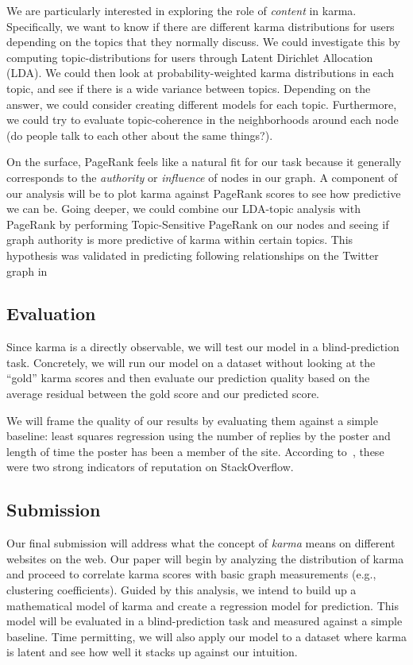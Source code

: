 \documentclass[10pt]{article}
\begin{document}
We are particularly interested in exploring the role of \textit{content} in
karma. Specifically, we want to know if there are different karma distributions
for users depending on the topics that they normally discuss. We could
investigate this by computing topic-distributions for users through Latent
Dirichlet Allocation (LDA). We could then look at probability-weighted karma
distributions in each topic, and see if there is a wide variance between topics.
Depending on the answer, we could consider creating different models for each
topic. Furthermore, we could try to evaluate topic-coherence in the
neighborhoods around each node (do people talk to each other about the same
things?).

On the surface, PageRank feels like a natural fit for our task because it
generally corresponds to the \textit{authority} or \textit{influence} of nodes
in our graph. A component of our analysis will be to plot karma against PageRank
scores to see how predictive we can be.  Going deeper, we could combine our
LDA-topic analysis with PageRank by performing Topic-Sensitive PageRank
\citep{haveliwala2002topic} on our nodes and seeing if graph authority is more
predictive of karma within certain topics. This hypothesis was validated in
predicting following relationships on the Twitter graph in
\citet{weng2010twitterrank}

\subsection{Evaluation}
Since karma is a directly observable, we will test our model in a
blind-prediction task. Concretely, we will run our model on a dataset without
looking at the ``gold'' karma scores and then evaluate our prediction quality
based on the average residual between the gold score and our predicted score.

We will frame the quality of our results by evaluating them against a simple
baseline: least squares regression using the number of replies by the poster and
length of time the poster has been a member of the site. According
to~\citet{movshovitzanalysis}, these were two strong indicators of reputation on
StackOverflow. 

\subsection{Submission}

Our final submission will address what the concept of \textit{karma} means on
different websites on the web. Our paper will begin by analyzing the
distribution of karma and proceed to correlate karma scores with basic graph
measurements (e.g., clustering coefficients). Guided by this analysis, we intend
to build up a mathematical model of karma and create a regression model for
prediction. This model will be evaluated in a blind-prediction task and measured
against a simple baseline. Time permitting, we will also apply our
model to a dataset where karma is latent and see how well it stacks up
against our intuition.



\end{document}
